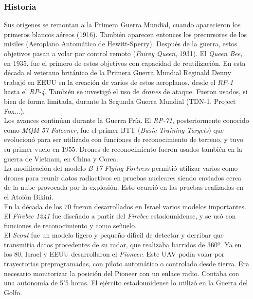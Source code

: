 \subsubsection{Historia}

Sus orígenes se remontan a la Primera Guerra Mundial, cuando aparecieron los primeros blancos aéreos (1916). También aparecen entonces los precursores de los misiles (Aeroplano Automático de Hewitt-Sperry). Después de la guerra, estos objetivos pasan a volar por control remoto (\emph{Fairey Queen}, 1931). El \emph{Queen Bee}, en 1935, fue el primero de estos objetivos con capacidad de reutilización. En esta década el veterano británico de la Primera Guerra Mundial Reginald Denny trabajó en EEUU en la creación de varios de estos aeroplanos, desde el \emph{RP-1} hasta el \emph{RP-4}. También se investigó el uso de \emph{drones} de ataque. Fueron usados, si bien de forma limitada, durante la Segunda Guerra Mundial (TDN-1, Project Fox...).\\

Los avances continúan durante la Guerra Fría. El \emph{RP-71}, posteriormente conocido como \emph{MQM-57 Falconer}, fue el primer BTT (\emph{Basic Training Targets}) que evolucionó para ser utilizado con funciones de reconocimiento de terreno, y tuvo su primer vuelo en 1955. Drones de reconocimiento fueron usados también en la guerra de Vietnam, en China y Corea.\\

La modificación del modelo \emph{B-17 Flying Fortress} permitió utilizar varios como drones para reunir datos radiactivos en pruebas nucleares siendo enviados cerca de la nube provocada por la explosión. Esto ocurrió en las pruebas realizadas en el Atolón Bikini.\\

En la década de los 70 fueron desarrollados en Israel varios modelos importantes. El \emph{Firebee 1241} fue diseñado a partir del \emph{Firebee} estadounidense, y se usó con funciones de reconocimiento y como señuelo.\\

El \emph{Scout} fue un modelo ligero y pequeño difícil de detectar y derribar que transmitía datos procedentes de su radar, que realizaba barridos de 360º. Ya en los 80, Israel y EEUU desarrollaron el \emph{Pioneer}. Este UAV podía volar por trayectorias preprogramadas, con piloto automático o controlado desde tierra. Era necesario monitorizar la posición del Pioneer con un enlace radio. Contaba con una autonomía de 5'5 horas. El ejército estadounidense lo utilizó en la Guerra del Golfo.\\


